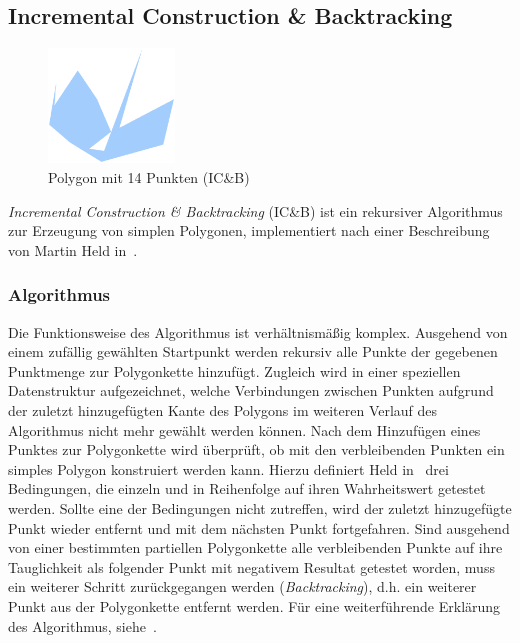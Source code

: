 \subsection{Incremental Construction \& Backtracking}

\begin{figure}[h]
\begin{center}
\includegraphics[width=0.3\textwidth]{img/icb14.eps}
\end{center}
\caption{Polygon mit 14 Punkten (IC\&B)}
\label{fig:icb14}
\end{figure}

\emph{Incremental Construction \& Backtracking} (IC\&B) ist ein rekursiver Algorithmus zur Erzeugung von simplen Polygonen, implementiert nach einer Beschreibung von Martin Held in~\cite{held98polygons}. 
\subsubsection{Algorithmus}
Die Funktionsweise des Algorithmus ist verhältnismäßig komplex. Ausgehend von einem zufällig gewählten Startpunkt werden rekursiv alle Punkte der gegebenen Punktmenge zur Polygonkette hinzufügt. Zugleich wird in einer speziellen Datenstruktur aufgezeichnet, welche Verbindungen zwischen Punkten aufgrund der zuletzt hinzugefügten Kante des Polygons im weiteren Verlauf des Algorithmus nicht mehr gewählt werden können. Nach dem Hinzufügen eines Punktes zur Polygonkette wird überprüft, ob mit den verbleibenden Punkten ein simples Polygon konstruiert werden kann. Hierzu definiert Held in~\cite{held98polygons} drei Bedingungen, die einzeln und in Reihenfolge auf ihren Wahrheitswert getestet werden. Sollte eine der Bedingungen nicht zutreffen, wird der zuletzt hinzugefügte Punkt wieder entfernt und mit dem nächsten Punkt fortgefahren. Sind ausgehend von einer bestimmten partiellen Polygonkette alle verbleibenden Punkte auf ihre Tauglichkeit als folgender Punkt mit negativem Resultat getestet worden, muss ein weiterer Schritt zurückgegangen werden (\emph{Backtracking}), d.h. ein weiterer Punkt aus der Polygonkette entfernt werden. Für eine weiterführende Erklärung des Algorithmus, siehe~\cite{held98polygons}.

